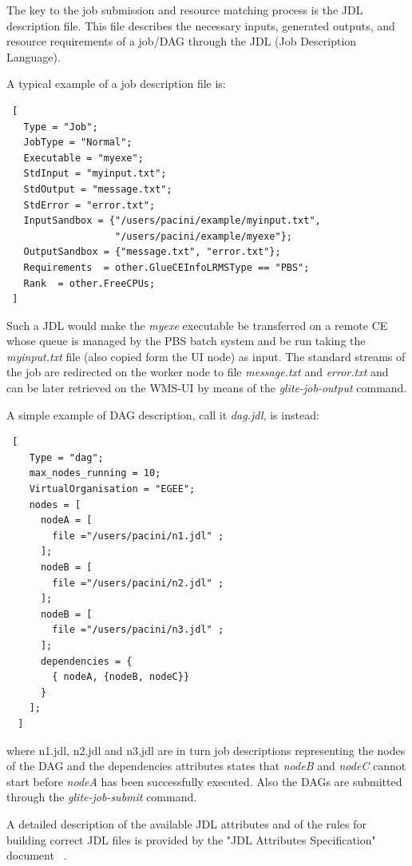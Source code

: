 The key to the job submission and resource matching process is the JDL description file. This file describes 
the necessary inputs, generated outputs, and resource requirements of a job/DAG through the JDL 
(Job Description Language).

A typical example of a job description file is:

\smallskip
\begin{verbatim}
 [
   Type = "Job";
   JobType = "Normal";
   Executable = "myexe";
   StdInput = "myinput.txt";
   StdOutput = "message.txt";
   StdError = "error.txt";
   InputSandbox = {"/users/pacini/example/myinput.txt", 
                   "/users/pacini/example/myexe"};
   OutputSandbox = {"message.txt", "error.txt"};
   Requirements  = other.GlueCEInfoLRMSType == "PBS";
   Rank  = other.FreeCPUs;
 ]
\end{verbatim}
\smallskip

Such a JDL would make the \emph{myexe} executable be transferred on a remote CE whose queue is managed by the PBS batch 
system and be run taking the \emph{myinput.txt} file (also copied form the UI node) as input. The standard streams of the 
job are redirected on the worker node to file \emph{message.txt} and \emph{error.txt} and can be later retrieved on the 
WMS-UI by means of the \emph{glite-job-output} command. 


A simple example of DAG description, call it \emph{dag.jdl}, is instead:

\smallskip
\begin{verbatim}
 [
    Type = "dag";
    max_nodes_running = 10;
    VirtualOrganisation = "EGEE";
    nodes = [
      nodeA = [
        file ="/users/pacini/n1.jdl" ; 
      ];
      nodeB = [
        file ="/users/pacini/n2.jdl" ; 
      ];
      nodeB = [
        file ="/users/pacini/n3.jdl" ; 
      ];
      dependencies = {
        { nodeA, {nodeB, nodeC}}
      }
    ];
  ]
\end{verbatim}
\smallskip

where n1.jdl, n2.jdl and n3.jdl are in turn job descriptions representing the nodes of the DAG and the dependencies 
attributes states that \textit{nodeB} and \textit{nodeC} cannot start before \textit{nodeA} has been successfully executed. 
Also the DAGs are submitted through the \emph{glite-job-submit} command.

A detailed description of the available JDL attributes and of the rules for building correct JDL files is 
provided by the "JDL Attributes Specification" document ~\cite{jdl}.  

